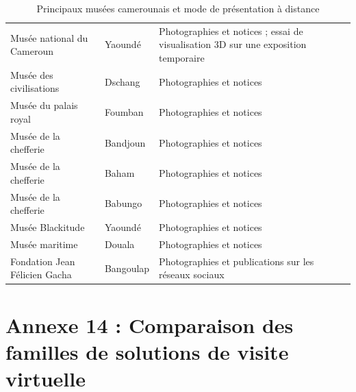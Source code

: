 \begin{table}[htbp]
\centering
\caption{Principaux musées camerounais et mode de présentation à distance}
\label{tab:museescmr}
\small
\begin{tabularx}{\textwidth}{|L{4.6cm}|L{2.6cm}|X|}
\hline
{}
 &  &  \\ \hline
Musée national du Cameroun & Yaoundé & Photographies et notices ; essai de visualisation 3D sur une exposition temporaire \\ \hline
Musée des civilisations & Dschang & Photographies et notices \\ \hline
Musée du palais royal & Foumban & Photographies et notices \\ \hline
Musée de la chefferie & Bandjoun & Photographies et notices \\ \hline
Musée de la chefferie & Baham & Photographies et notices \\ \hline
Musée de la chefferie & Babungo & Photographies et notices \\ \hline
Musée Blackitude & Yaoundé & Photographies et notices \\ \hline
Musée maritime & Douala & Photographies et notices \\ \hline
Fondation Jean Félicien Gacha & Bangoulap & Photographies et publications sur les réseaux sociaux \\ \hline
\end{tabularx}
\end{table}

\cleardoublepage
\chapter*{Annexe 14 : Comparaison des familles de solutions de visite virtuelle}

\vspace{0.3cm}

